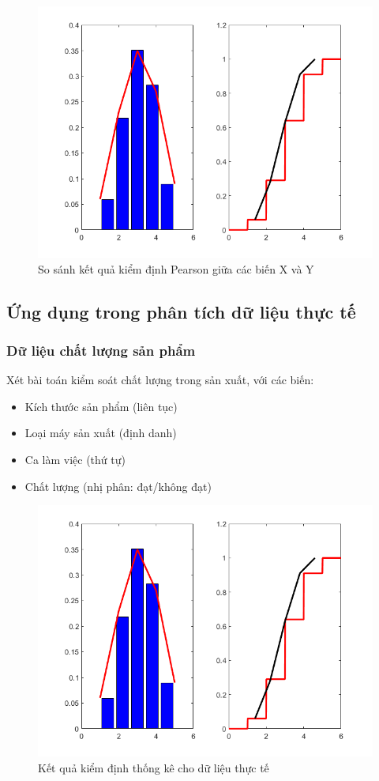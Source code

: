 \begin{figure}[h!]
    \centering
    \includegraphics[width=0.8\linewidth]{../../assets/images/X_Y_PTest.png}
    \caption{So sánh kết quả kiểm định Pearson giữa các biến X và Y}
\end{figure}

\subsection{Ứng dụng trong phân tích dữ liệu thực tế}
\subsubsection*{Dữ liệu chất lượng sản phẩm}
Xét bài toán kiểm soát chất lượng trong sản xuất, với các biến:
\begin{itemize}
    \item Kích thước sản phẩm (liên tục)
    \item Loại máy sản xuất (định danh)
    \item Ca làm việc (thứ tự)
    \item Chất lượng (nhị phân: đạt/không đạt)
\end{itemize}

\begin{figure}[h!]
    \centering
    \includegraphics[width=0.8\linewidth]{../../assets/images/X_Y_PTest.png}
    \caption{Kết quả kiểm định thống kê cho dữ liệu thực tế}
\end{figure}

